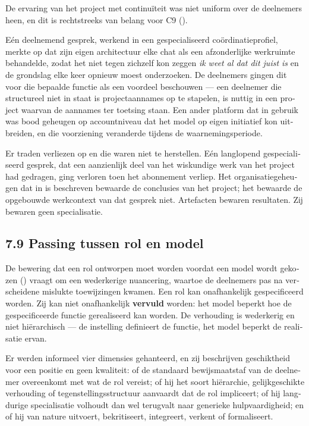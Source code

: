 \begin{dutch}
De ervaring van het project met continuïteit was niet uniform over de deelnemers heen, en dit is rechtstreeks van belang voor C9 ().

Eén deelnemend gesprek, werkend in een gespecialiseerd coördinatieprofiel, merkte op dat zijn eigen architectuur elke chat als een afzonderlijke werkruimte behandelde, zodat het niet tegen zichzelf kon zeggen \emph{ik weet al dat dit juist is} en de grondslag elke keer opnieuw moest onderzoeken. De deelnemers gingen dit voor die bepaalde functie als een voordeel beschouwen — een deelnemer die structureel niet in staat is projectaannames op te stapelen, is nuttig in een project waarvan de aannames ter toetsing staan. Een ander platform dat in gebruik was bood geheugen op accountniveau dat het model op eigen initiatief kon uitbreiden, en die voorziening veranderde tijdens de waarnemingsperiode.

Er traden verliezen op en die waren niet te herstellen. Eén langlopend gespecialiseerd gesprek, dat een aanzienlijk deel van het wiskundige werk van het project had gedragen, ging verloren toen het abonnement verliep. Het organisatiegeheugen dat in  is beschreven bewaarde de conclusies van het project; het bewaarde de opgebouwde werkcontext van dat gesprek niet. Artefacten bewaren resultaten. Zij bewaren geen specialisatie.


\subsection*{7.9 Passing tussen rol en model}
\label{sec:nl:7.9}

De bewering dat een rol ontworpen moet worden voordat een model wordt gekozen () vraagt om een wederkerige nuancering, waartoe de deelnemers pas na verscheidene mislukte toewijzingen kwamen. Een rol kan onafhankelijk gespecificeerd worden. Zij kan niet onafhankelijk \textbf{vervuld} worden: het model beperkt hoe de gespecificeerde functie gerealiseerd kan worden. De verhouding is wederkerig en niet hiërarchisch — de instelling definieert de functie, het model beperkt de realisatie ervan.

Er werden informeel vier dimensies gehanteerd, en zij beschrijven geschiktheid voor een positie en geen kwaliteit: of de standaard bewijsmaatstaf van de deelnemer overeenkomt met wat de rol vereist; of hij het soort hiërarchie, gelijkgeschikte verhouding of tegenstellingsstructuur aanvaardt dat de rol impliceert; of hij langdurige specialisatie volhoudt dan wel terugvalt naar generieke hulpvaardigheid; en of hij van nature uitvoert, bekritiseert, integreert, verkent of formaliseert.


\end{dutch}
